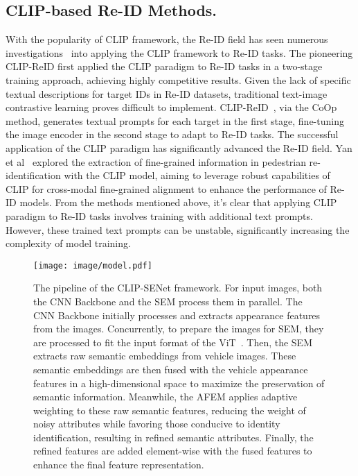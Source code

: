 \subsection{CLIP-based Re-ID Methods.}
With the popularity of CLIP framework, the Re-ID field has seen numerous investigations~\cite{li2023clip, lin2023exploring, yan2023clip} into applying the CLIP framework to Re-ID tasks. The pioneering CLIP-ReID first applied the CLIP paradigm to Re-ID tasks in a two-stage training approach, achieving highly competitive results. Given the lack of specific textual descriptions for target IDs in Re-ID datasets, traditional text-image contrastive learning proves difficult to implement. CLIP-ReID~\cite{li2023clip}, via the CoOp~\cite{zhou2022learning} method, generates textual prompts for each target in the first stage, fine-tuning the image encoder in the second stage to adapt to Re-ID tasks. The successful application of the CLIP paradigm has significantly advanced the Re-ID field. Yan et al~\cite{yan2023clip} explored the extraction of fine-grained information in pedestrian re-identification with the CLIP model, aiming to leverage robust capabilities of CLIP for cross-modal fine-grained alignment to enhance the performance of Re-ID models. 
From the methods mentioned above, it's clear that applying CLIP paradigm to Re-ID tasks involves training with additional text prompts. However, these trained text prompts can be unstable, significantly increasing the complexity of model training.

\begin{figure*}[!t]
\texttt{[image: image/model.pdf]}
\caption{The pipeline of the CLIP-SENet framework.
For input images, both the CNN Backbone and the SEM process them in parallel. The CNN Backbone initially processes and extracts appearance features from the images. Concurrently, to prepare the images for SEM, they are processed to fit the input format of the ViT~\cite{dosovitskiy2020image}. Then, the SEM extracts raw semantic embeddings from vehicle images. These semantic embeddings are then fused with the vehicle appearance features in a high-dimensional space to maximize the preservation of semantic information. Meanwhile, the AFEM applies adaptive weighting to these raw semantic features,  reducing the weight of noisy attributes while favoring those conducive to identity identification, resulting in refined semantic attributes. Finally, the refined features are added element-wise with the fused features to enhance the final feature representation.}
\label{fig:model}
\end{figure*}